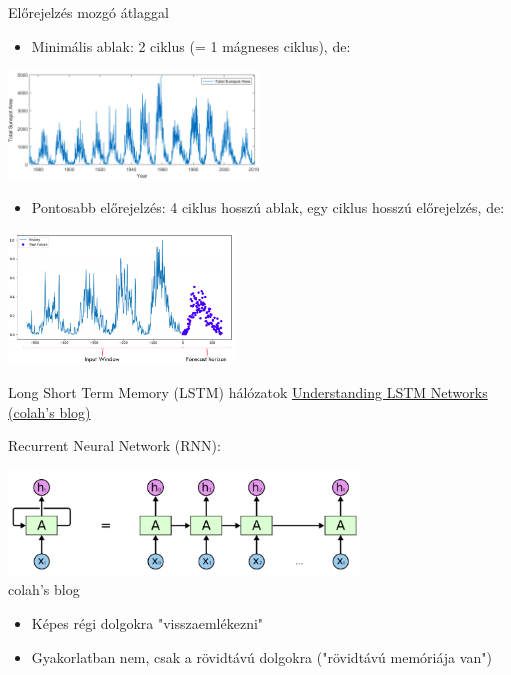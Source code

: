 \begin{frame}{Előrejelzés mozgó átlaggal}
    \begin{itemize}
        \item Minimális ablak: 2 ciklus (= 1 mágneses ciklus), de:
    \end{itemize}
    \centering
    \includegraphics[width=0.5\textwidth]{figures/solar_cycle_zoom.png}
    
    \pause
    \begin{itemize}
        \item Pontosabb előrejelzés: 4 ciklus hosszú ablak, egy ciklus hosszú előrejelzés, de:
    \end{itemize}
    \centering
    \includegraphics[width=0.45\textwidth]{figures/solar_cycle_moving_avg.png}
\end{frame}

\begin{frame}{Long Short Term Memory (LSTM) hálózatok}
    \href{https://colah.github.io/posts/2015-08-Understanding-LSTMs/}{Understanding LSTM Networks (colah's blog)}
    
    Recurrent Neural Network (RNN):
    
    \centering
    \includegraphics[width=0.7\textwidth]{figures/rnn.png} \\ \footnotesize{colah's blog}
    
    \normalsize
    \begin{itemize}
        \item Képes régi dolgokra "visszaemlékezni"
        \item Gyakorlatban nem, csak a rövidtávú dolgokra ("rövidtávú memóriája van")
    \end{itemize}
\end{frame}

